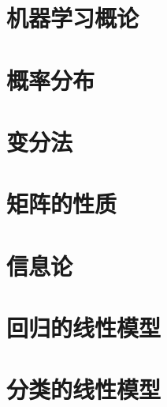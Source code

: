 \chapter{机器学习概论}





\chapter{概率分布}






\chapter{变分法}

\chapter{矩阵的性质}

\chapter{信息论}

\chapter{回归的线性模型}







\chapter{分类的线性模型}







